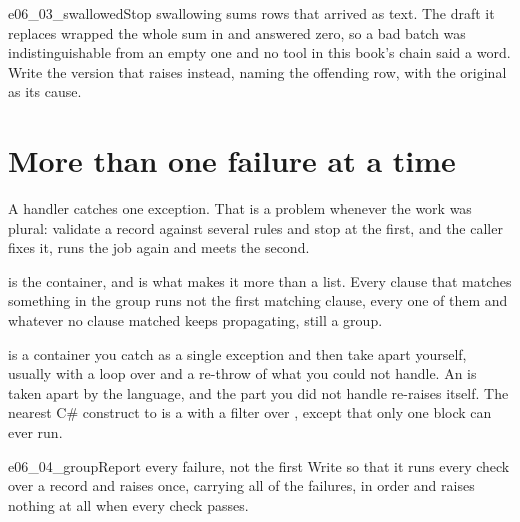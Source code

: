 \begin{exercise}{e06_03_swallowed}{Stop swallowing}
 sums rows that arrived as text. The draft it replaces wrapped
the whole sum in  and answered zero, so a bad batch
was indistinguishable from an empty one and no tool in this book's chain
said a word. Write the version that raises instead, naming the offending
row, with the original as its cause.
\end{exercise}

\section{More than one failure at a time}
\label{sec:ch06-groups}

A handler catches one exception. That is a problem whenever the work was
plural: validate a record against several rules and stop at the first, and
the caller fixes it, runs the job again and meets the second.


\noindent
{} is the container, and  is what makes it
more than a list. Every clause that matches something in the group runs
\dash{} not the first matching clause, every one of them \dash{} and
whatever no clause matched keeps propagating, still a group.



\begin{csbox}
 is a container you catch as a single exception and
then take apart yourself, usually with a loop over
 and a re-throw of what you could not handle. An
 is taken apart by the language, and the part you did
not handle re-raises itself. The nearest C\# construct to  is
a  with a  filter over , except
that only one  block can ever run.
\end{csbox}


\begin{exercise}{e06_04_group}{Report every failure, not the first}
Write  so that it runs every check over a record and raises
once, carrying all of the failures, in order \dash{} and raises nothing at
all when every check passes.
\end{exercise}


